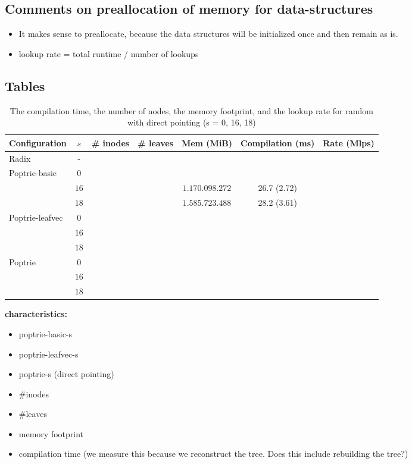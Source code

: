 \documentclass{article}
\begin{document}
\subsection{Comments on preallocation of memory for data-structures}
\begin{itemize}
    \item It makes sense to preallocate, because the data
    structures will be initialized once and then remain as is.
    \item lookup rate = total runtime / number of lookups
\end{itemize}

\newpage
\subsection{Tables}

\begin{table}
    \begin{center}
        \begin{tabular}{|l|c|c|c|c|c|c|}
            \hline
            Configuration   & $s$ & \# inodes & \# leaves & Mem (MiB) & Compilation (ms) & Rate (Mlps) \\ 
            \hline
            Radix           & -   & &  & & & \\ 
            \hline                           
            Poptrie-basic   & $0$ & & &  & & \\  
                            & $16$ & & & $1.170.098.272$ & 26.7 (2.72) & \\  
                            & $18$ & & & $1.585.723.488$ & 28.2 (3.61) & \\  
            \hline                           
            Poptrie-leafvec & $0$ & & & & & \\
                            & $16$ & & & & & \\
                            & $18$ & & & & & \\
            \hline
            Poptrie         & $0$  & & & & & \\
                            & $16$ & & & & & \\
                            & $18$ & & & & & \\
            \hline
        \end{tabular}
    \end{center}
    \caption{The compilation time, the number of nodes, the memory footprint, and the lookup rate for
random with direct pointing (s = 0, 16, 18)}
\end{table}
\noindent
\textbf{characteristics:}
\begin{itemize}
    \item poptrie-basic-s
    \item poptrie-leafvec-s
    \item poptrie-s (direct pointing)
    \item \#inodes
    \item \#leaves
    \item memory footprint
    \item compilation time (we measure this because
    we reconstruct the tree. Does this include rebuilding the tree?)
\end{itemize}
\end{document}
